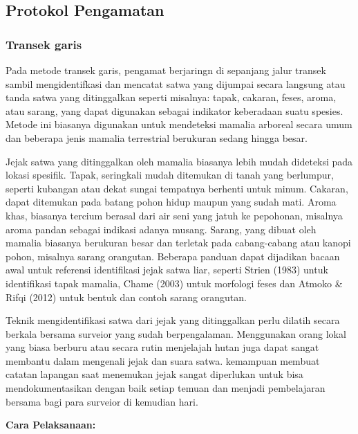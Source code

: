 \documentclass[
  oneside]{book}
\begin{document}
\hypertarget{protokol-pengamatan-2}{%
\subsection*{Protokol Pengamatan}\label{protokol-pengamatan-2}}

\hypertarget{transek-garis}{%
\subsubsection*{Transek garis}\label{transek-garis}}

Pada metode transek garis, pengamat berjaringn di sepanjang jalur transek sambil mengidentifkasi dan mencatat satwa yang dijumpai secara langsung atau tanda satwa yang ditinggalkan seperti misalnya: tapak, cakaran, feses, aroma, atau sarang, yang dapat digunakan sebagai indikator keberadaan suatu spesies. Metode ini biasanya digunakan untuk mendeteksi mamalia arboreal secara umum dan beberapa jenis mamalia terrestrial berukuran sedang hingga besar.

Jejak satwa yang ditinggalkan oleh mamalia biasanya lebih mudah dideteksi pada lokasi spesifik. Tapak, seringkali mudah ditemukan di tanah yang berlumpur, seperti kubangan atau dekat sungai tempatnya berhenti untuk minum. Cakaran, dapat ditemukan pada batang pohon hidup maupun yang sudah mati. Aroma khas, biasanya tercium berasal dari air seni yang jatuh ke pepohonan, misalnya aroma pandan sebagai indikasi adanya musang. Sarang, yang dibuat oleh mamalia biasanya berukuran besar dan terletak pada cabang-cabang atau kanopi pohon, misalnya sarang orangutan. Beberapa panduan dapat dijadikan bacaan awal untuk referensi identifikasi jejak satwa liar, seperti Strien (1983) untuk identifikasi tapak mamalia, Chame (2003) untuk morfologi feses dan Atmoko \& Rifqi (2012) untuk bentuk dan contoh sarang orangutan.

Teknik mengidentifikasi satwa dari jejak yang ditinggalkan perlu dilatih secara berkala bersama surveior yang sudah berpengalaman. Menggunakan orang lokal yang biasa berburu atau secara rutin menjelajah hutan juga dapat sangat membantu dalam mengenali jejak dan suara satwa. kemampuan membuat catatan lapangan saat menemukan jejak sangat diperlukan untuk bisa mendokumentasikan dengan baik setiap temuan dan menjadi pembelajaran bersama bagi para surveior di kemudian hari.

\textbf{Cara Pelaksanaan:}
\end{document}
